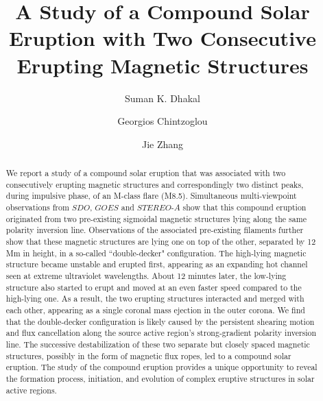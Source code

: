 \documentclass{aastex62}
\begin{document}
\title{\textbf{A Study of a  Compound Solar Eruption with Two Consecutive Erupting Magnetic Structures}}



\author{Suman K. Dhakal}

\author{Georgios Chintzoglou}

\author{Jie Zhang}


\begin{abstract}
We report a study of a compound solar eruption that was associated with two consecutively erupting magnetic structures and correspondingly two distinct peaks, during impulsive phase, of an M-class flare (M8.5). Simultaneous multi-viewpoint observations from $\textit{SDO}$, $\textit{GOES}$ and $\textit{STEREO-A}$ show that this compound eruption originated from two pre-existing sigmoidal magnetic structures lying along the same polarity inversion line. Observations of the associated pre-existing filaments further show that these magnetic structures are lying one on top of the other, separated by 12 Mm in height, in a so-called ``double-decker" configuration. The high-lying magnetic structure became unstable and erupted first, appearing as an expanding hot channel seen at extreme ultraviolet wavelengths. About 12 minutes later, the low-lying structure also started to erupt and moved at an even faster speed compared to the high-lying one. As a result, the two erupting structures interacted and merged with each other, appearing as a single coronal mass ejection in the outer corona. We find that the double-decker configuration is likely caused by the persistent shearing motion and flux cancellation along the source active region's strong-gradient polarity inversion line. The successive destabilization of these two separate but closely spaced magnetic structures, possibly in the form of magnetic flux ropes, led to a compound solar eruption. The study of the compound eruption provides a unique opportunity to reveal the formation process, initiation, and evolution of complex eruptive structures in solar active regions. 
\end{abstract}
\end{document}
